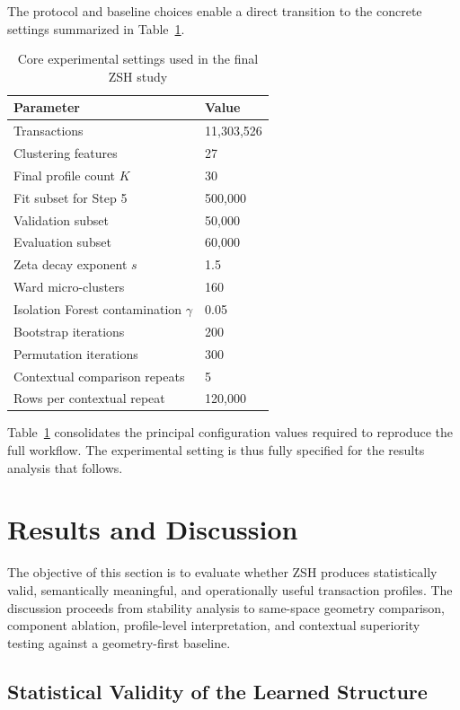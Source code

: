 \documentclass{ieeeaccess}
\begin{document}
The protocol and baseline choices enable a direct transition to the concrete settings summarized in Table~\ref{tab:settings}.

\begin{table}[!t]
\caption{Core experimental settings used in the final ZSH study}
\label{tab:settings}
\centering
\begin{tabular}{ll}
\toprule
Parameter & Value \\
\midrule
Transactions & 11,303,526 \\
Clustering features & 27 \\
Final profile count $K$ & 30 \\
Fit subset for Step 5 & 500,000 \\
Validation subset & 50,000 \\
Evaluation subset & 60,000 \\
Zeta decay exponent $s$ & 1.5 \\
Ward micro-clusters & 160 \\
Isolation Forest contamination $\gamma$ & 0.05 \\
Bootstrap iterations & 200 \\
Permutation iterations & 300 \\
Contextual comparison repeats & 5 \\
Rows per contextual repeat & 120,000 \\
\bottomrule
\end{tabular}
\end{table}

Table~\ref{tab:settings} consolidates the principal configuration values required to reproduce the full workflow. The experimental setting is thus fully specified for the results analysis that follows.

\section{Results and Discussion}

The objective of this section is to evaluate whether ZSH produces statistically valid, semantically meaningful, and operationally useful transaction profiles. The discussion proceeds from stability analysis to same-space geometry comparison, component ablation, profile-level interpretation, and contextual superiority testing against a geometry-first baseline.

\subsection{Statistical Validity of the Learned Structure}
\end{document}
